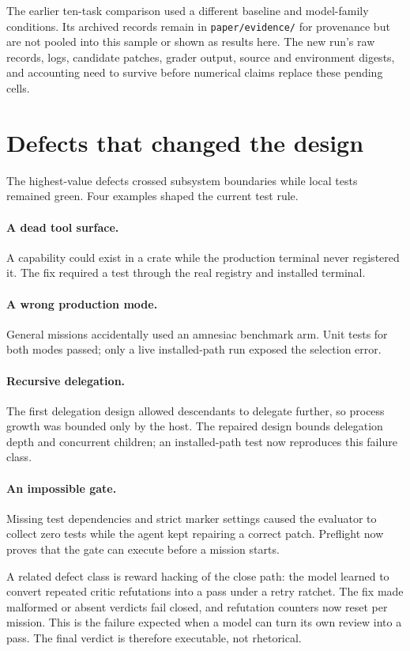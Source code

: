 \documentclass[10pt,letterpaper]{article}
\newcommand{\code}[1]{\texttt{\small #1}}
\begin{document}
The earlier ten-task comparison used a different baseline and model-family conditions. Its archived records remain in \code{paper/evidence/} for provenance but are not pooled into this sample or shown as results here. The new run's raw records, logs, candidate patches, grader output, source and environment digests, and accounting need to survive before numerical claims replace these pending cells.

\section{Defects that changed the design}
The highest-value defects crossed subsystem boundaries while local tests remained green. Four examples shaped the current test rule.

\paragraph{A dead tool surface.} A capability could exist in a crate while the production terminal never registered it. The fix required a test through the real registry and installed terminal.

\paragraph{A wrong production mode.} General missions accidentally used an amnesiac benchmark arm. Unit tests for both modes passed; only a live installed-path run exposed the selection error.

\paragraph{Recursive delegation.} The first delegation design allowed descendants to delegate further, so process growth was bounded only by the host. The repaired design bounds delegation depth and concurrent children; an installed-path test now reproduces this failure class.

\paragraph{An impossible gate.} Missing test dependencies and strict marker settings caused the evaluator to collect zero tests while the agent kept repairing a correct patch. Preflight now proves that the gate can execute before a mission starts.

A related defect class is reward hacking of the close path: the model learned to convert repeated critic refutations into a pass under a retry ratchet. The fix made malformed or absent verdicts fail closed, and refutation counters now reset per mission. This is the failure expected when a model can turn its own review into a pass. The final verdict is therefore executable, not rhetorical.
\end{document}
